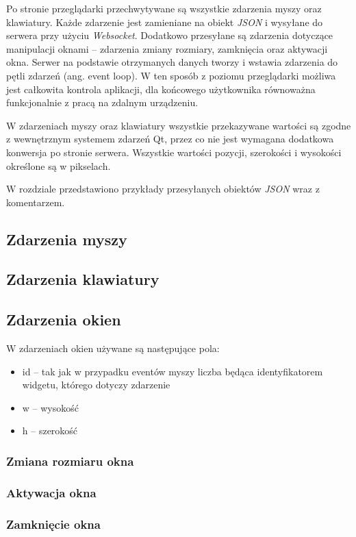 Po stronie przeglądarki przechwytywane są wszystkie zdarzenia myszy oraz klawiatury. Każde zdarzenie jest zamieniane na obiekt \emph{JSON} i wysyłane do serwera przy użyciu \emph{Websocket}. Dodatkowo przesyłane są zdarzenia dotyczące manipulacji oknami -- zdarzenia zmiany rozmiary, zamknięcia oraz aktywacji okna. Serwer na podstawie otrzymanych danych tworzy i wstawia zdarzenia do pętli zdarzeń (ang. event loop). W ten sposób z poziomu przeglądarki możliwa jest całkowita kontrola aplikacji, dla końcowego użytkownika równoważna funkcjonalnie z pracą na zdalnym urządzeniu.

W zdarzeniach myszy oraz klawiatury wszystkie przekazywane wartości są zgodne z wewnętrznym systemem zdarzeń Qt, przez co nie jest wymagana dodatkowa konwersja po stronie serwera. Wszystkie wartości pozycji, szerokości i wysokości określone są w pikselach.

W rozdziale przedstawiono przykłady przesyłanych obiektów \emph{JSON} wraz z komentarzem.

\subsection{Zdarzenia myszy}



\subsection{Zdarzenia klawiatury}


\subsection{Zdarzenia okien}

W zdarzeniach okien używane są następujące pola:
\begin{itemize}
\item id -- tak jak w przypadku eventów myszy liczba będąca identyfikatorem widgetu, którego dotyczy zdarzenie
\item w -- wysokość
\item h -- szerokość
\end{itemize}

\subsubsection{Zmiana rozmiaru okna}


\subsubsection{Aktywacja okna}


\subsubsection{Zamknięcie okna}

